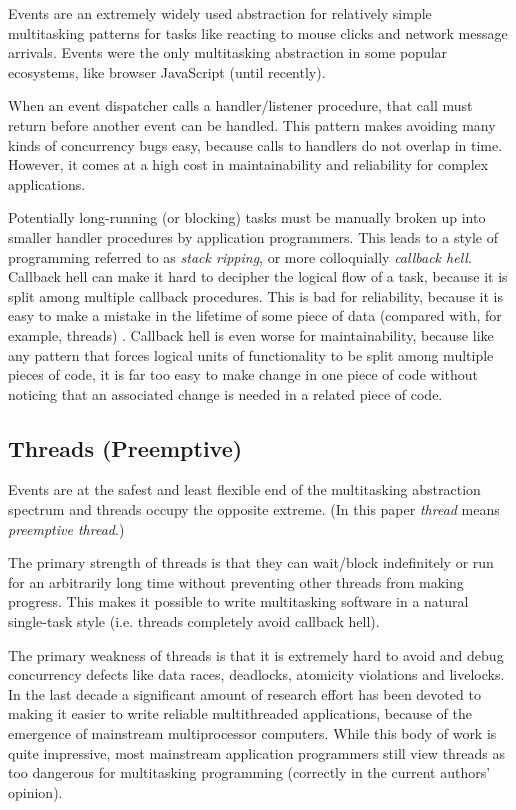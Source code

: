 \documentclass[10pt,preprint]{sigplanconf}
\begin{document}
Events are an extremely widely used abstraction for relatively simple multitasking patterns for tasks like reacting to mouse clicks and network message arrivals.
Events were the only multitasking abstraction in some popular ecosystems, like browser JavaScript (until recently).

When an event dispatcher calls a handler/listener procedure, that call must return before another event can be handled.
This pattern makes avoiding many kinds of concurrency bugs easy, because calls to handlers do not overlap in time.
However, it comes at a high cost in maintainability and reliability for complex applications.

Potentially long-running (or blocking) tasks must be manually broken up into smaller handler procedures by application programmers.
This leads to a style of programming referred to as \emph{stack ripping}\cite{Adya2002}, or more colloquially \emph{callback hell}.
Callback hell can make it hard to decipher the logical flow of a task, because it is split among  multiple callback procedures.
This is bad for reliability, because it is easy to make a mistake in the lifetime of some piece of data (compared with, for example, threads) \cite{Behren2003a}.
Callback hell is even worse for maintainability, because like any pattern that forces logical units of functionality to be split among multiple pieces of code, it is far too easy to make change in one piece of code without noticing that an associated change is needed in a related piece of code.

\subsection{Threads (Preemptive)}

Events are at the safest and least flexible end of the multitasking abstraction spectrum and threads occupy the opposite extreme.
(In this paper \emph{thread} means \emph{preemptive thread}.)

The primary strength of threads is that they can wait/block indefinitely or run for an arbitrarily long time without preventing other threads from making progress.
This makes it possible to write multitasking software in a natural single-task style (i.e. threads completely avoid callback hell).

The primary weakness of threads is that it is extremely hard to avoid and debug concurrency defects like data races, deadlocks, atomicity violations and livelocks.
In the last decade a significant amount of research effort has been devoted to making it easier to write reliable multithreaded applications, because of the emergence of mainstream multiprocessor computers.
While this body of work is quite impressive, most mainstream application programmers still view threads as too dangerous for multitasking programming (correctly in the current authors' opinion).
\end{document}

